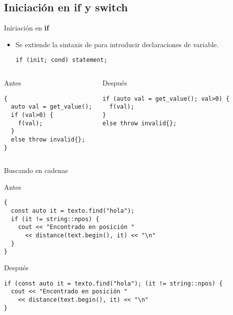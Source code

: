 \subsection{Iniciación en {\bf if} y {\bf switch}}

\begin{frame}[t,fragile]{Iniciación en \textbf{if}}
\begin{itemize}
  \item Se extiende la sintaxis de  para introducir declaraciones de variable.
\begin{lstlisting}
if (init; cond) statement;
\end{lstlisting}
\end{itemize}

\vfill\pause
\begin{columns}[T]

\begin{block}{Antes}
\begin{lstlisting}
{
  auto val = get_value();
  if (val>0) {
    f(val);
  }
  else throw invalid{}; 
}
\end{lstlisting}
\end{block}

\pause
{}
\begin{block}{Después}
\begin{lstlisting}
if (auto val = get_value(); val>0) {
  f(val);
}
else throw invalid{};
\end{lstlisting}
\end{block}

\end{columns}
\end{frame}


\begin{frame}[t,fragile]{Buscando en cadenas}
\begin{block}{Antes}
\begin{lstlisting}
{
  const auto it = texto.find("hola");
  if (it != string::npos) {
    cout << "Encontrado en posición "
      << distance(text.begin(), it) << "\n"
  }
}
\end{lstlisting}
\end{block}

\pause
\begin{block}{Después}
\begin{lstlisting}
if (const auto it = texto.find("hola"); (it != string::npos) {
  cout << "Encontrado en posición "
    << distance(text.begin(), it) << "\n"
}
\end{lstlisting}
\end{block}
\end{frame}


